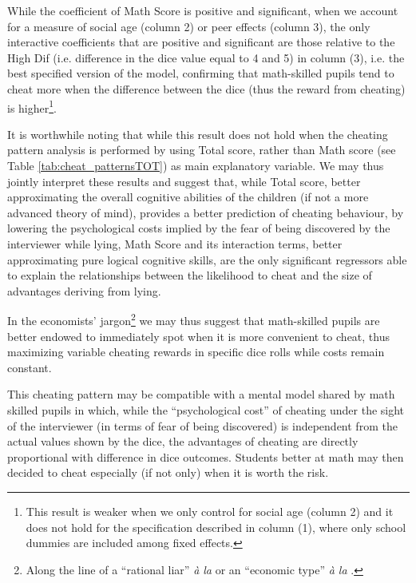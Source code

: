 \documentclass[authoryear, preprint, review, 12pt]{elsarticle}
\begin{document}


While the coefficient of Math Score is positive and significant, when we account for a measure of social age (column 2) or peer effects (column 3), the only interactive coefficients that are positive and significant are those relative to the High Dif (i.e. difference in the dice value equal to 4 and 5) in column (3), i.e. the best specified version of the model, confirming that math-skilled pupils tend to cheat more when the difference between the dice (thus the reward from cheating) is higher\footnote{This result is weaker when we only control for social age (column 2) and it does not hold for the specification described in column (1), where only school dummies are included among fixed effects.}.

It is worthwhile noting that while this result does not hold when the cheating pattern analysis is performed by using Total score, rather than Math score (see Table \ref{tab:cheat_patternsTOT}) as main explanatory variable. We may thus jointly interpret these results and suggest that, while Total score, better approximating the overall cognitive abilities of the children (if not a more advanced theory of mind), provides a better prediction of cheating behaviour, by lowering the psychological costs implied by the fear of being discovered by the interviewer while lying, Math Score and its interaction terms, better approximating pure logical cognitive skills, are the only significant regressors able to explain the relationships between the likelihood to cheat and the size of advantages deriving from lying. 



In the economists' jargon\footnote{Along the line of a \enquote{rational liar} \textit{à la} \cite{becker1968crime} or an \enquote{economic type} \textit{à la} \citet[p. 391]{g05}.} we may thus suggest that math-skilled pupils are better endowed to immediately spot when it is more convenient to cheat, thus maximizing variable cheating rewards in specific dice rolls while costs remain constant.

This cheating pattern may be compatible with a mental model shared by math skilled pupils in which, while the \enquote{psychological cost} of cheating under the sight of the interviewer (in terms of fear of being discovered) is independent from the actual values shown by the dice, the advantages of cheating are directly proportional with difference in dice outcomes. Students better at math may then decided to cheat especially (if not only) when it is worth the risk.   
\end{document}
